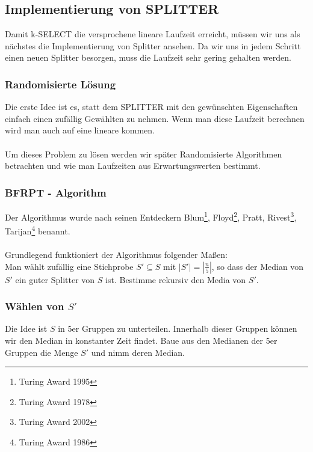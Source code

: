 \begin{description}
\subsection{Implementierung von SPLITTER}

Damit k-SELECT die versprochene lineare Laufzeit erreicht, müssen wir uns als nächstes die Implementierung von Splitter ansehen. Da wir uns in jedem Schritt einen neuen Splitter besorgen, muss die Laufzeit sehr gering gehalten werden.

\subsubsection{Randomisierte Lösung}

Die erste Idee ist es, statt dem SPLITTER mit den gewünschten Eigenschaften einfach einen zufällig Gewählten zu nehmen. Wenn man diese Laufzeit berechnen wird man auch auf eine lineare kommen.\\
\vspace{\baselineskip}\\
Um dieses Problem zu lösen werden wir später Randomisierte Algorithmen betrachten und wie man Laufzeiten aus Erwartungswerten bestimmt.

\subsubsection{BFRPT - Algorithm}

Der Algorithmus wurde nach seinen Entdeckern Blum\footnote{Turing Award 1995}, Floyd\footnote{Turing Award 1978}, Pratt, Rivest\footnote{Turing Award 2002}, Tarijan\footnote{Turing Award 1986} benannt.\\
\vspace{\baselineskip}\\
Grundlegend funktioniert der Algorithmus folgender Maßen:\\
Man wählt zufällig eine Stichprobe $S' \subseteq S$ mit $\left| S' \right| = \left| \frac{n}{5} \right|$, so dass der Median von $S'$ ein guter Splitter von $S$ ist. Bestimme rekursiv den Media von $S'$.

\subsubsection{Wählen von $S'$}

Die Idee ist $S$ in 5er Gruppen zu unterteilen. Innerhalb dieser Gruppen können wir den Median in konstanter Zeit findet. Baue aus den Medianen der 5er Gruppen die Menge $S'$ und nimm deren Median.


\end{description}
